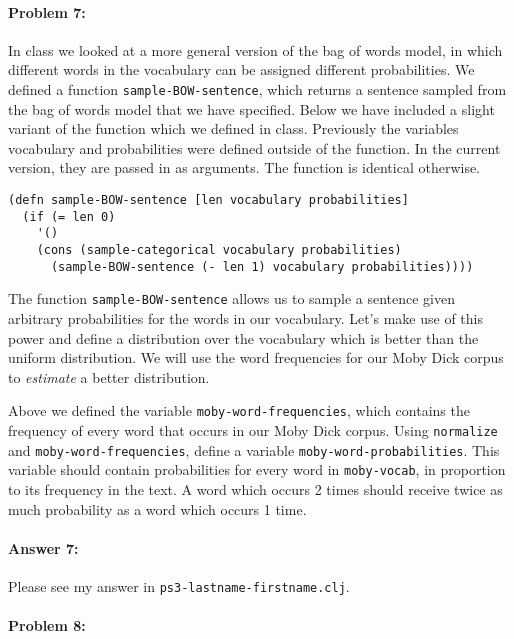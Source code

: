 \documentclass[10pt]{article}
\newcommand{\PSnum}{3}
\begin{document}
\noindent\hrulefill %

\paragraph{Problem 7:}

In class we looked at a more general version of the bag of words
model, in which different words in the vocabulary can be assigned
different probabilities. We defined a function \texttt{sample-BOW-sentence},
which returns a sentence sampled from the bag of words model that we
have specified. Below we have included a slight variant of the
function which we defined in class. Previously the variables
vocabulary and probabilities were defined outside of the function. In
the current version, they are passed in as arguments. The function is
identical otherwise.

\begin{lstlisting}
(defn sample-BOW-sentence [len vocabulary probabilities]
  (if (= len 0)
    '()
    (cons (sample-categorical vocabulary probabilities)
	  (sample-BOW-sentence (- len 1) vocabulary probabilities))))
\end{lstlisting}

The function \texttt{sample-BOW-sentence} allows us to sample a
sentence given arbitrary probabilities for the words in our
vocabulary. Let's make use of this power and define a distribution
over the vocabulary which is better than the uniform distribution. We
will use the word frequencies for our Moby Dick corpus to
\emph{estimate} a better distribution.
  
Above we defined the variable \texttt{moby-word-frequencies}, which
contains the frequency of every word that occurs in our Moby Dick
corpus. Using \texttt{normalize} and \texttt{moby-word-frequencies},
define a variable \texttt{moby-word-probabilities}. This variable
should contain probabilities for every word in \texttt{moby-vocab}, in
proportion to its frequency in the text. A word which occurs 2 times
should receive twice as much probability as a word which occurs 1
time.

\paragraph{Answer 7:} Please see my answer in
\texttt{ps\PSnum-lastname-firstname.clj}.

\noindent\hrulefill %

\paragraph{Problem 8:}
\end{document}
